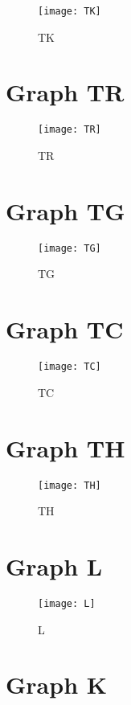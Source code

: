\documentclass[a4paper,10pt]{article}
\begin{document}
\begin{figure}[h!]
  \centering
    \texttt{[image: TK]}
  \caption{TK}
\end{figure}

\section{Graph TR}

\begin{figure}[h!]
  \centering
    \texttt{[image: TR]}
  \caption{TR}
\end{figure}

\section{Graph TG}

\begin{figure}[h!]
  \centering
    \texttt{[image: TG]}
  \caption{TG}
\end{figure}

\section{Graph TC}

\begin{figure}[h!]
  \centering
    \texttt{[image: TC]}
  \caption{TC}
\end{figure}


\section{Graph TH}

\begin{figure}[h!]
  \centering
    \texttt{[image: TH]}
  \caption{TH}
\end{figure}


\section{Graph L}

\begin{figure}[h!]
  \centering
    \texttt{[image: L]}
  \caption{L}
\end{figure}

\section{Graph K}
\end{document}
